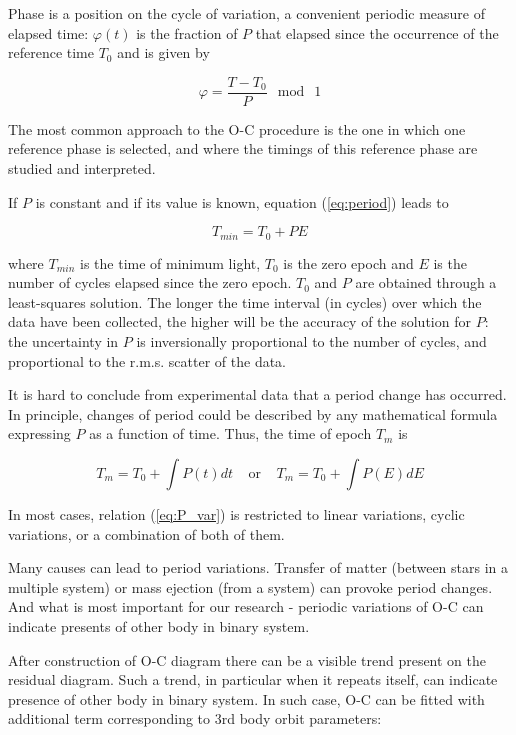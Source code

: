 Phase is a position on the cycle of variation, a convenient periodic measure of
elapsed time: $\varphi (t)$ is the fraction of $P$ that elapsed since the occurrence of the
reference time $T_{0}$ and is given by

\begin{equation} \label{eq:phase}
\varphi = \frac{T-T_{0}}{P} ~\bmod~ 1
\end{equation}

The most common approach to the O-C procedure is the one in which one reference 
phase is selected, and where the timings of this reference phase are studied
and interpreted.


If $P$ is constant and if its value is known, equation (\ref{eq:period}) leads to

\begin{equation} \label{eq:Tmin2}
T_{min} = T_{0} + P E
\end{equation}

where $T_{min}$ is the time of minimum light, $T_{0}$
is the zero epoch and $E$ is the number of cycles elapsed since the zero epoch. $T_{0}$ and
$P$ are obtained through a least-squares solution. The longer the time interval (in
cycles) over which the data have been collected, the higher will be the accuracy
of the solution for $P$: the uncertainty in $P$ is inversionally proportional to the
number of cycles, and proportional to the r.m.s. scatter of the data.

It is hard to conclude from experimental data that a period change has occurred. 
In principle, changes of period could be described by any mathematical formula expressing $P$ as a function of time.
Thus, the time of epoch $T_{m}$ is

\begin{equation} \label{eq:P_var}
T_{m} = T_{0} + \int P(t)dt   ~~~~~\mathrm{or}~~~~~   T_{m} = T_{0} + \int P(E)dE
\end{equation}

In most cases, relation (\ref{eq:P_var}) is restricted to linear variations, cyclic variations, or
a combination of both of them.

Many causes can lead to period variations.
Transfer of matter (between stars in a multiple system) or mass ejection (from a system)
can provoke period changes. And what is most important for our research - periodic variations of O-C can indicate presents of other body in binary system.

After construction of O-C diagram there can be a visible trend present on the residual diagram.
Such a trend, in particular when it repeats itself, 
can indicate presence of other body in binary system. 
In such case, O-C can be fitted with additional term corresponding to 3rd body orbit parameters:  

